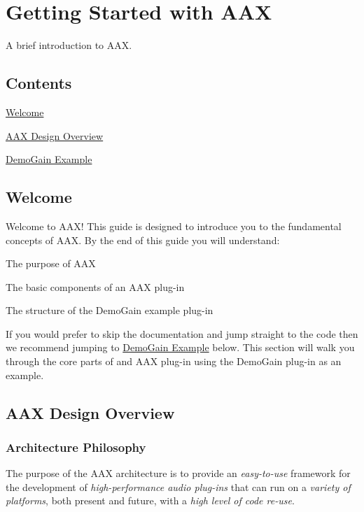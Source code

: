 \hypertarget{a00324}{}\section{Getting Started with A\+A\+X}
\label{a00324}
A brief introduction to A\+A\+X. 

\hypertarget{a00324_aax_getting_started_guide_contents}{}\subsection{Contents}\label{a00324_aax_getting_started_guide_contents}
\begin{DoxyItemize}
\item \hyperlink{a00324_aax_sdk_guide_00_introduction}{Welcome} \item \hyperlink{a00324_aax_sdk_guide_01_aax_design_overview}{A\+A\+X Design Overview} \item \hyperlink{a00324_aax_sdk_guide_02_demogain_example}{Demo\+Gain Example}\end{DoxyItemize}
 \hypertarget{a00324_aax_sdk_guide_00_introduction}{}\subsection{Welcome}\label{a00324_aax_sdk_guide_00_introduction}
 Welcome to A\+A\+X! This guide is designed to introduce you to the fundamental concepts of A\+A\+X. By the end of this guide you will understand\+: \begin{DoxyItemize}
\item The purpose of A\+A\+X \item The basic components of an A\+A\+X plug-\/in \item The structure of the Demo\+Gain example plug-\/in\end{DoxyItemize}
If you would prefer to skip the documentation and jump straight to the code then we recommend jumping to \hyperlink{a00324_aax_sdk_guide_02_demogain_example}{Demo\+Gain Example} below. This section will walk you through the core parts of and A\+A\+X plug-\/in using the Demo\+Gain plug-\/in as an example. 

 \hypertarget{a00324_aax_sdk_guide_01_aax_design_overview}{}\subsection{A\+A\+X Design Overview}\label{a00324_aax_sdk_guide_01_aax_design_overview}
\hypertarget{a00324_subsection__architecture_philosophy}{}\subsubsection{Architecture Philosophy}\label{a00324_subsection__architecture_philosophy}
The purpose of the A\+A\+X architecture is to provide an {\itshape easy-\/to-\/use} framework for the development of {\itshape high-\/performance audio plug-\/ins} that can run on a {\itshape variety of platforms}, both present and future, with a {\itshape high level of code re-\/use}.

